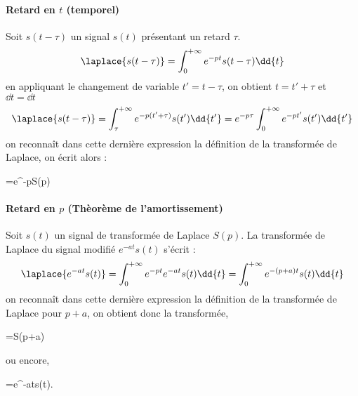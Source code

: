 \paragraph{Retard en $t$ (temporel)}
Soit $s(t-\tau)$ un signal $s(t)$ présentant un retard $\tau$.
$$
\laplace{s(t-\tau)}=\int_{0}^{+\infty} e^{-pt}s(t-\tau)\dd{t}
$$
en appliquant le changement de variable $t'=t-\tau$, on obtient $t=t'+\tau$ et $\dd{t}=\dd{t}$
$$
\laplace{s(t-\tau)}=\int_{\tau}^{+\infty} e^{-p(t'+\tau)}s(t')\dd{t'}=e^{-p\tau}\int_{0}^{+\infty} e^{-pt'}s(t')\dd{t'}
$$
on reconnaît dans cette dernière expression la définition de la transformée de Laplace, on écrit alors :
\begin{bequation}
    =e^{-p\tau}S(p)
\end{bequation}
\paragraph{Retard en $p$ (Thèorème de l'amortissement)}
Soit $s(t)$ un signal de transformée de Laplace $S(p)$. La transformée 
de Laplace du signal modifié $e^{-at}s(t)$ s'écrit :
$$
\laplace{e^{-at}s(t)}=\int_{0}^{+\infty} e^{-pt}e^{-at}s(t)\dd{t}=\int_{0}^{+\infty} e^{-(p+a)t}s(t)\dd{t}
$$
on reconnaît dans cette dernière expression la définition de la transformée de Laplace pour $p+a$,
 on obtient donc la transformée,
\begin{bequation}
    =S(p+a)
\end{bequation}
ou encore,
\begin{bequation}
    =e^{-at}s(t).
\end{bequation}



